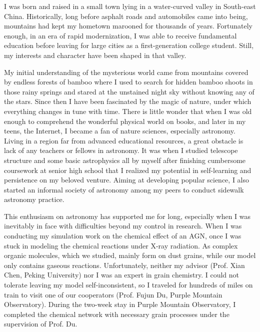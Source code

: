\documentclass[11pt, a4paper]{awesome-cv} %
\begin{document}
\makecvheader %



\begin{cvletter}


I was born and raised in a small town lying in a water-curved valley in South-east China. Historically, long before asphalt roads and automobiles came into being, mountains had kept my hometown marooned for thousands of years. Fortunately enough, in an era of rapid modernization, I was able to receive fundamental education before leaving for large cities as a first-generation college student. Still, my interests and character have been shaped in that valley.

My initial understanding of the mysterious world came from mountains covered by endless forests of bamboo where I used to search for hidden bamboo shoots in those rainy springs and stared at the unstained night sky without knowing any of the stars. Since then I have been fascinated by the magic of nature, under which everything changes in tune with time. There is little wonder that when I was old enough to comprehend the wonderful physical world on books, and later in my teens, the Internet, I became a fan of nature sciences, especially astronomy. Living in a region far from advanced educational resources, a great obstacle is lack of any teachers or fellows in astronomy. It was when I studied telescope structure and some basic astrophysics all by myself after finishing cumbersome coursework at senior high school that I realized my potential in self-learning and persistence on my beloved venture. Aiming at developing popular science, I also started an informal society of astronomy among my peers to conduct sidewalk astronomy practice.

This enthusiasm on astronomy has supported me for long, especially when I was inevitably in face with difficulties beyond my control in research. When I was conducting my simulation work on the chemical effect of an AGN, once I was stuck in modeling the chemical reactions under X-ray radiation. As complex organic molecules, which we studied, mainly form on dust grains, while our model only contains gaseous reactions. Unfortunately, neither my advisor (Prof. Xian Chen, Peking University) nor I was an expert in grain chemistry. I could not tolerate leaving my model self-inconsistent, so I traveled for hundreds of miles on train to visit one of our cooperators (Prof. Fujun Du, Purple Mountain Observatory). During the two-week stay in Purple Mountain Observatory, I completed the chemical network with necessary grain processes under the supervision of Prof. Du.


\end{cvletter}
\end{document}
